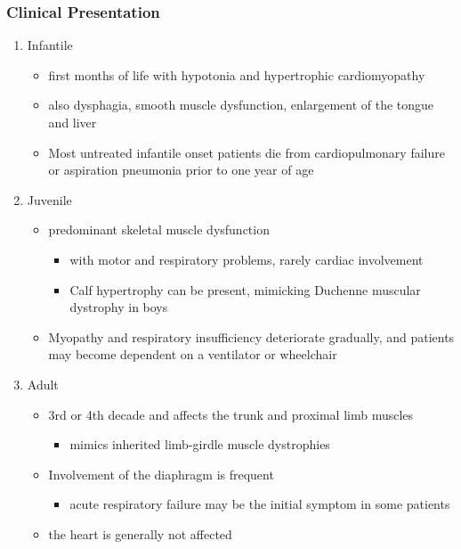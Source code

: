 \documentclass{scrartcl}
\begin{document}
\subsubsection{Clinical Presentation}
\label{sec:orgdf90b8e}
\begin{enumerate}
\item Infantile
\label{sec:orga72c2a5}
\begin{itemize}
\item first months of life with hypotonia and hypertrophic cardiomyopathy
\item also dysphagia, smooth muscle dysfunction, enlargement of the tongue
and liver
\item Most untreated infantile onset patients die from cardiopulmonary
failure or aspiration pneumonia prior to one year of age
\end{itemize}
\item Juvenile
\label{sec:orgaeb5eb9}
\begin{itemize}
\item predominant skeletal muscle dysfunction
\begin{itemize}
\item with motor and respiratory problems, rarely cardiac involvement
\item Calf hypertrophy can be present, mimicking Duchenne muscular dystrophy in boys
\end{itemize}
\item Myopathy and respiratory insufficiency deteriorate gradually, and patients may become dependent on a ventilator or wheelchair
\end{itemize}
\item Adult
\label{sec:orgccf1906}
\begin{itemize}
\item 3rd or 4th decade and affects the trunk and proximal limb muscles
\begin{itemize}
\item mimics inherited limb-girdle muscle dystrophies
\end{itemize}
\item Involvement of the diaphragm is frequent
\begin{itemize}
\item acute respiratory failure may be the initial symptom in some patients
\end{itemize}
\item the heart is generally not affected
\end{itemize}
\end{enumerate}
\end{document}
